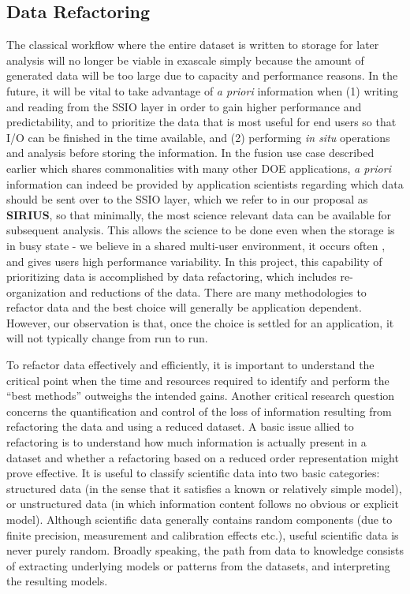 \subsection{Data Refactoring} \label{sec:data-refactor} 

The classical workflow where the entire dataset is written to storage for
later analysis will no longer be viable in exascale simply because the amount of generated data will 
be too large due to capacity and performance reasons.
In the future, it will be vital to take advantage of \textit{a priori}
information when (1) writing and reading from the SSIO layer in order to gain
higher performance and predictability, and to prioritize the data that
is most useful for end users so that I/O can be finished in the time available, and (2)
performing {\em in situ} operations and analysis before storing the information.
In the fusion use case described earlier which shares commonalities with many other
DOE applications, \textit{a priori} information can indeed be provided by application
scientists regarding which data should be sent over to the SSIO layer, which we refer
to in our proposal as {\bf SIRIUS}, so that
minimally, the most science relevant data can be available for subsequent analysis.
This allows the science to be done even when the storage is in busy state - we believe
in a shared multi-user environment, it occurs often \cite{liu_hotstorage}, and gives users
high performance variability.
In this project, this capability of prioritizing data is accomplished by data refactoring, 
which includes re-organization and reductions of the data.
There are many methodologies to refactor data and the best choice will generally
be application dependent. However, our observation is that, once the choice is settled for an application, 
it will not typically change from run to run. 

To refactor data effectively and efficiently, it is important to understand
the critical point when the time and resources required to
identify and perform the ``best methods'' outweighs the intended gains. Another
critical research question concerns the quantification and control of the loss
of information resulting from refactoring the data and using a reduced dataset. 
A basic issue allied to refactoring is to understand how much information is
actually present in a dataset and whether a refactoring based on a reduced
order representation might prove effective. It is useful to classify scientific
data into two basic categories: structured data (in the sense that it satisfies
a known or relatively simple model), or unstructured data (in which information
content follows no obvious or explicit model).  Although scientific data
generally contains random components (due to finite precision, measurement and
calibration effects etc.), useful scientific data is never purely random.
Broadly speaking, the path from data to knowledge consists of extracting
underlying models or patterns from the datasets, and interpreting the resulting
models. 

